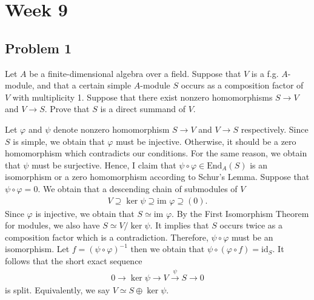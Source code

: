 \section{Week 9}
\subsection*{Problem 1}
Let $A$ be a finite-dimensional algebra over a field. Suppose that $V$ is a f.g. $A$-module, and that a certain simple $A$-module $S$ occurs as a composition factor of $V$ with multiplicity 1. Suppose that there exist nonzero homomorphisms $S \to V$ and $V \to S$. Prove that $S$ is a direct summand of $V$.
\begin{solution}
    Let $\varphi$ and $\psi$ denote nonzero homomorphism $S\to V$ and $V\to S$ respectively.
    Since $S$ is simple, we obtain that $\varphi$ must be injective. Otherwise, it should be a zero homomorphism which contradicts our conditions.
    For the same reason, we obtain that $\psi$ must be surjective. Hence, I claim that $\psi\circ \varphi\in \text{End}_A(S)$ is an isomorphism or a zero homomorphism according to Schur's Lemma.
    Suppose that $\psi\circ \varphi=0$. We obtain that a descending chain of submodules of $V$
    \begin{align*}
        V\supseteq \ker{\psi}\supseteq \text{im }\varphi\supseteq (0).
    \end{align*}
    Since $\varphi$ is injective, we obtain that $S\simeq \text{im }\varphi$. By the First Isomorphism Theorem for modules, we also have $S\simeq V/{\ker \psi}$.
    It implies that $S$ occurs twice as a composition factor which is a contradiction. Therefore, $\psi\circ \varphi$ must be an isomorphism.
    Let $f= (\psi\circ\varphi)^{-1}$ then we obtain that $\psi\circ(\varphi\circ f)=\text{id}_S$. It follows that the short exact sequence 
    \begin{align*}
        0\to \ker \psi \to V \xrightarrow{\psi} S\to 0
    \end{align*}
    is split. Equivalently, we say $V\simeq S\oplus \ker \psi$.
\end{solution}



